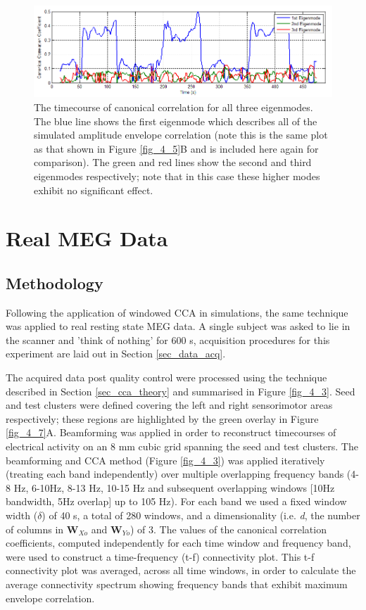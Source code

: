 \begin{figure}
	\includegraphics[width=\linewidth]{./images/chapter4/figure_6.png}\caption{The timecourse of canonical correlation for all three eigenmodes. The blue line shows the first eigenmode which describes all of the simulated amplitude envelope correlation (note this is the same plot as that shown in Figure \ref{fig_4_5}B and is included here again for comparison). The green and red lines show the second and third eigenmodes respectively; note that in this case these higher modes exhibit no significant effect.}\label{fig_4_6}
\end{figure}
\clearpage

\section{Real MEG Data}\label{sec_cca_real}
\subsection{Methodology}
Following the application of windowed CCA in simulations, the same technique was applied to real resting state MEG data. A single subject was asked to lie in the scanner and 'think of nothing' for 600 s, acquisition procedures for this experiment are laid out in Section \ref{sec_data_acq}.

The acquired data post quality control were processed using the technique described in Section \ref{sec_cca_theory} and summarised in Figure \ref{fig_4_3}. Seed and test clusters were defined covering the left and right sensorimotor areas respectively; these regions are highlighted by the green overlay in Figure \ref{fig_4_7}A. Beamforming was applied in order to reconstruct timecourses of electrical activity on an 8 mm cubic grid spanning the seed and test clusters. The beamforming and CCA method (Figure \ref{fig_4_3}) was applied iteratively (treating each band independently) over multiple overlapping frequency bands (4-8 Hz, 6-10Hz, 8-13 Hz, 10-15 Hz and subsequent overlapping windows [10Hz bandwidth, 5Hz overlap] up to 105 Hz). For each band we used a fixed window width ($\delta$) of 40 s, a total of 280 windows, and a dimensionality (i.e. \textit{d}, the number of columns in $\mathbf{W}_{Xo}$ and  $\mathbf{W}_{Yo}$) of 3. The values of the canonical correlation coefficients, computed independently for each time window and frequency band, were used to construct a time-frequency (t-f) connectivity plot. This t-f connectivity plot was averaged, across all time windows, in order to calculate the average connectivity spectrum showing frequency bands that exhibit maximum envelope correlation.

